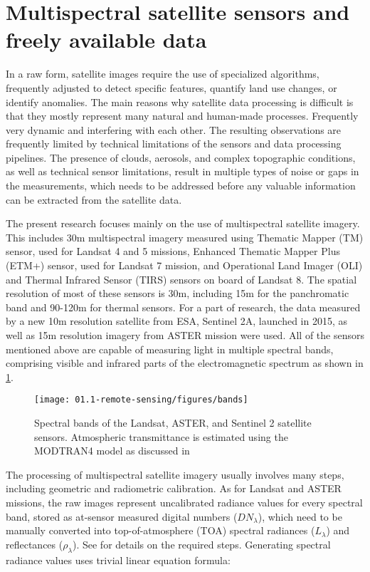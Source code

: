 \section{Multispectral satellite sensors and freely available data}

In a raw form, satellite images require the use of specialized algorithms, frequently adjusted to detect specific features, quantify land use changes, or identify anomalies. The main reasons why satellite data processing is difficult is that they mostly represent many natural and human-made processes. Frequently very dynamic and interfering with each other. The resulting observations are frequently limited by technical limitations of the sensors and data processing pipelines. The presence of clouds, aerosols, and complex topographic conditions, as well as technical sensor limitations, result in multiple types of noise or gaps in the measurements, which needs to be addressed before any valuable information can be extracted from the satellite data.

The present research focuses mainly on the use of multispectral satellite imagery. This includes 30m multispectral imagery measured using Thematic Mapper (TM) sensor, used for Landsat 4 and 5 missions, Enhanced Thematic Mapper Plus (ETM+) sensor, used for Landsat 7 mission, and Operational Land Imager (OLI) and Thermal Infrared Sensor (TIRS) sensors on board of Landsat 8. The spatial resolution of most of these sensors is 30m, including 15m for the panchromatic band and 90-120m for thermal sensors. For a part of research, the data measured by a new 10m resolution satellite from ESA, Sentinel 2A, launched in 2015, as well as 15m resolution imagery from ASTER mission \citep{REF} were used.  All of the sensors mentioned above are capable of measuring light in multiple spectral bands, comprising visible and infrared parts of the electromagnetic spectrum as shown in \ref{fig:sensor-bands}.

\begin{figure}
	\texttt{[image: 01.1-remote-sensing/figures/bands]}
	\caption{Spectral bands of the Landsat, ASTER, and Sentinel 2 satellite sensors. Atmospheric transmittance is estimated using the MODTRAN4 model as discussed in \citep{verhoef2003simulation}}
	\label{fig:sensor-bands}
\end{figure}

The processing of multispectral satellite imagery usually involves many steps, including geometric and radiometric calibration. As for Landsat and ASTER missions, the raw images represent uncalibrated radiance values for every spectral band, stored as at-sensor measured digital numbers ($DN_\lambda$), which need to be manually converted into top-of-atmosphere (TOA) spectral radiances ($L_\lambda$) and reflectances ($\rho_\lambda$). See \citep{chander2009summary} for details on the required steps. Generating spectral radiance values uses trivial linear equation formula:

